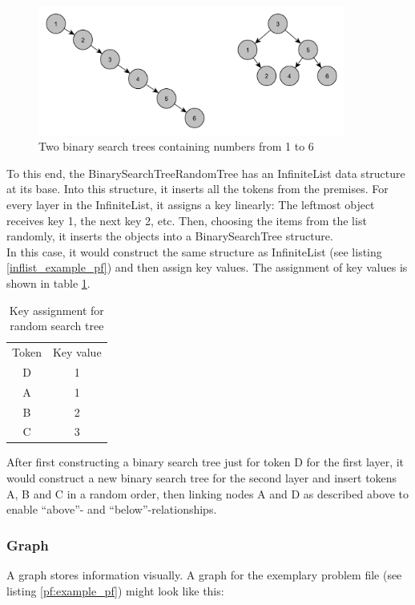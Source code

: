 \documentclass[hidelinks]{scrartcl}
\begin{document}
\begin{figure}[H]
	\caption{Two binary search trees containing numbers from 1 to 6}
	\label{img:random_tree}
	\centering
	\includegraphics[width=0.9\textwidth]{Illustrations/BinarySearchTreeRandomTree.pdf}
\end{figure}

To this end, the BinarySearchTreeRandomTree has an InfiniteList data structure at its base. Into this structure, it inserts all the tokens from the premises. For every layer in the InfiniteList, it assigns a key linearly: The leftmost object receives key 1, the next key 2, etc. Then, choosing the items from the list randomly, it inserts the objects into a BinarySearchTree structure. \\
In this case, it would construct the same structure as InfiniteList (see listing \ref{inflist_example_pf}) and then assign key values. The assignment of key values is shown in table \ref{tab:random_search_tree_keys}.

\begin{table}[H]
\caption{Key assignment for random search tree} 
\label{tab:random_search_tree_keys}
\centering
	\begin{tabular}{c c}
	Token 	& Key value \\
	D		& 1 \\
	\hline
	A		& 1 \\
	B		& 2 \\
	C		& 3
	\end{tabular}
\end{table}

After first constructing a binary search tree just for token D for the first layer, it would construct a new binary search tree for the second layer and insert tokens A, B and C in a random order, then linking nodes A and D as described above to enable ``above''- and ``below''-relationships.

\subsubsection{Graph}
A graph stores information visually. A graph for the exemplary problem file (see listing \ref{pf:example_pf}) might look like this:
\end{document}
